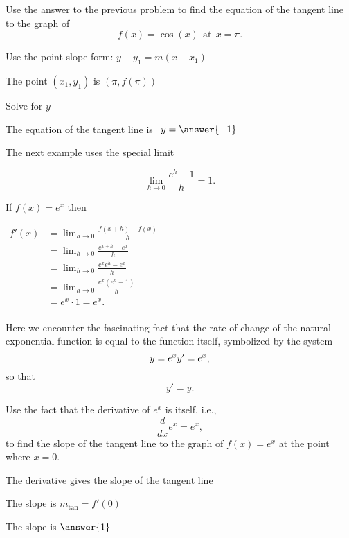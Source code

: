 \documentclass{ximera}
\begin{document}
\begin{problem} %
Use the answer to the previous problem to find the equation of the tangent line to the graph of 
\[
f(x) = \cos(x) \ \ \text{at} \ \ x=\pi.
\]
\begin{hint}
Use the point slope form: $y-y_1 = m(x-x_1)$
\end{hint}
\begin{hint}
The point $(x_1,y_1)$ is $(\pi, f(\pi))$
\end{hint}
\begin{hint}
Solve for $y$
\end{hint}
The equation of the tangent line is \ $y = \answer{-1}$
\end{problem}



The next example uses the special limit 

\[\lim_{h \to 0} \frac{e^h-1}{h} = 1.\]


\begin{example} %
If $f(x) = e^x$ then\\[-15pt]
\begin{center}
$\begin{aligned}
f'(x) &= \lim_{h \to 0} \frac{f(x+h)-f(x)}{h} \\[5pt]
&= \lim_{h \to 0}\frac{e^{x+h}-e^x}{h}\\[5pt]
&= \lim_{h \to 0} \frac{e^x e^h-e^x}{h}\\[5pt]
&= \lim_{h \to 0} \frac{e^x (e^h-1)}{h}\\[5pt]
&= e^x \cdot 1 = e^x.\\[-5pt]
\end{aligned}$
\end{center}
Here we encounter the fascinating fact that the rate of change of the natural exponential function
is equal to the function itself, symbolized by the system
\[
y=e^x\\
y' = e^x,
\]
so that 
\[
y' = y.
\]

\end{example}


\begin{problem} %
Use the fact that the derivative of $e^x$ is itself,
i.e., 
\[
\frac{d}{dx}e^x=e^x,
\]
to find the slope of the tangent line to the graph of 
$f(x) = e^x$ at the point where $x = 0$.\\
\begin{hint}
The derivative gives the slope of the tangent line
\end{hint}
\begin{hint}
The slope is $m_{\text{tan}} = f'(0)$
\end{hint}
The slope is $\answer{1}$
\end{problem}
\end{document}
